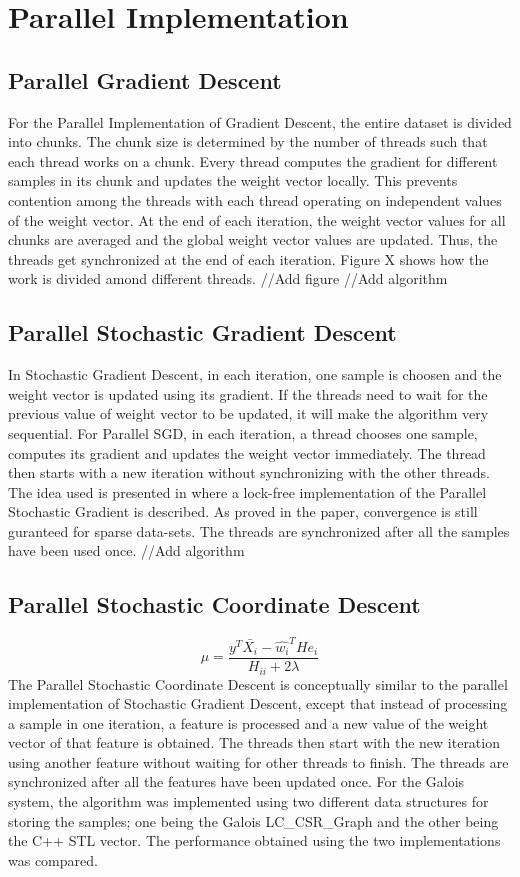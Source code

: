 \documentclass{sigplanconf}
\begin{document}
\section{Parallel Implementation}
\subsection{Parallel Gradient Descent}
For the Parallel Implementation of Gradient Descent, the entire dataset is divided into chunks. The chunk size is determined by the number
of threads such that each thread works on a chunk. Every thread computes the gradient for different samples in its chunk and updates
the weight vector locally. This prevents contention among the threads with each thread operating on independent values of the weight
vector. At the end of each iteration, the weight vector values for all chunks are averaged and the global weight vector
values are updated. Thus, the threads get synchronized at the end of each iteration. Figure X shows how the work is divided amond different
threads.
//Add figure
//Add algorithm

\subsection{Parallel Stochastic Gradient Descent}
In Stochastic Gradient Descent, in each iteration, one sample is choosen and the weight vector is updated using its gradient. 
If the threads need to wait for the previous value of weight vector to be updated, it will make the algorithm very sequential. For Parallel SGD, in each iteration, a thread chooses one sample, computes its gradient and updates the weight vector immediately. The thread then starts with a new iteration without synchronizing with the other threads. The idea used is presented in \cite{rich1} where a lock-free implementation of the Parallel Stochastic Gradient is described. As proved in the paper, convergence is still guranteed for sparse data-sets. The threads are synchronized after all the samples have been used once.
//Add algorithm

\subsection{Parallel Stochastic Coordinate Descent}
\begin{equation} \mu = \frac{y^T \bar{X_i} - \widehat{w_i}^T H e_i }{H_{ii} + 2\lambda} \end{equation}
The Parallel Stochastic Coordinate Descent is conceptually similar to the parallel implementation of Stochastic Gradient Descent, except that instead of
processing a sample in one iteration, a feature is processed and a new value of the weight vector of that feature is obtained. The threads then start with
the new iteration using another feature without waiting for other threads to finish. The threads are synchronized after all the features have been
updated once. For the Galois system, the algorithm was implemented using two different data structures for storing the samples; one being the 
Galois LC\_CSR\_Graph and the other being the C++ STL vector. The performance obtained using the two implementations was compared.
\end{document}
